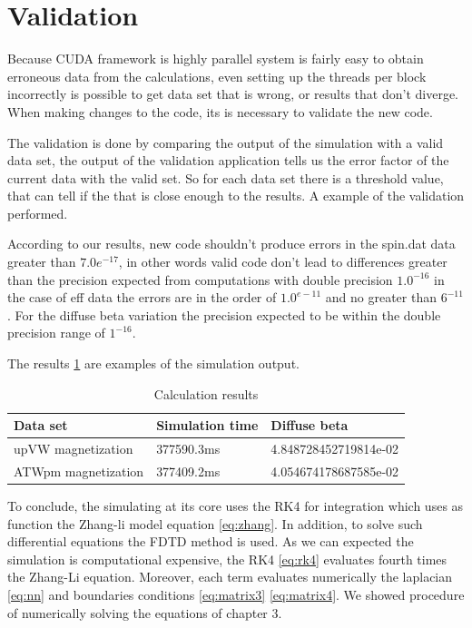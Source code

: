 \section{Validation}

Because CUDA framework is highly parallel system is fairly easy to obtain erroneous data from the calculations, even setting up the threads per block incorrectly is possible to get data set that is wrong, or results that don't diverge. When making changes to the code, its is necessary to validate the new code.

The validation is done by comparing the output of the simulation with a valid data set, the output of the validation application tells us the error factor of the current data with the valid set. So for each data set there is a threshold value, that can tell if the that is close enough to the results. A example of the validation performed.

According to our results, new code shouldn't produce errors in the spin.dat data 
greater than $7.0e^{-17}$, in other words valid code don't lead to differences greater than
the precision expected from computations with double precision $1.0^{-16}$ in the case of eff data the errors are in the order of $1.0^{e-11}$ and no greater than $6^{-11}$. For the diffuse beta variation the precision expected to be within the double precision range of $1^{-16}$. 

The results \ref{tab:results} are examples of the simulation output.

\begin{table}[h]
\centering
\begin{tabular}{| l | l | l |}
\hline
Data set & Simulation time & Diffuse beta  \\
\hline
upVW magnetization & 377590.3ms & 4.848728452719814e-02 \\
\hline
ATWpm magnetization & 377409.2ms & 4.054674178687585e-02 \\
\hline
\end{tabular}
\caption{Calculation results}
\label{tab:results}
\end{table}


\vspace{3.5em}

To conclude, the simulating at its core uses the RK4 for integration which uses as function the Zhang-li model equation \ref{eq:zhang}. In addition, to solve such differential equations the FDTD method is used. As we can expected the simulation is computational expensive, the RK4 \ref{eq:rk4} evaluates fourth times the Zhang-Li equation. Moreover, each term evaluates numerically the  laplacian \ref{eq:nn} and boundaries conditions \ref{eq:matrix3} \ref{eq:matrix4}. We showed procedure of numerically solving the equations of chapter 3.



